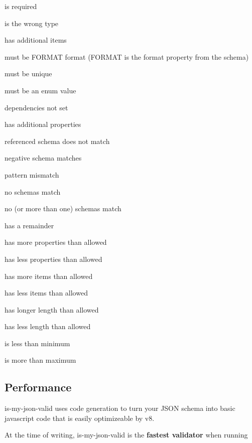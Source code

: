 \begin{DoxyItemize}
\item {\ttfamily is required}
\item {\ttfamily is the wrong type}
\item {\ttfamily has additional items}
\item {\ttfamily must be F\+O\+R\+M\+AT format} (F\+O\+R\+M\+AT is the {\ttfamily format} property from the schema)
\item {\ttfamily must be unique}
\item {\ttfamily must be an enum value}
\item {\ttfamily dependencies not set}
\item {\ttfamily has additional properties}
\item {\ttfamily referenced schema does not match}
\item {\ttfamily negative schema matches}
\item {\ttfamily pattern mismatch}
\item {\ttfamily no schemas match}
\item {\ttfamily no (or more than one) schemas match}
\item {\ttfamily has a remainder}
\item {\ttfamily has more properties than allowed}
\item {\ttfamily has less properties than allowed}
\item {\ttfamily has more items than allowed}
\item {\ttfamily has less items than allowed}
\item {\ttfamily has longer length than allowed}
\item {\ttfamily has less length than allowed}
\item {\ttfamily is less than minimum}
\item {\ttfamily is more than maximum}
\end{DoxyItemize}

\subsection*{Performance}

is-\/my-\/json-\/valid uses code generation to turn your J\+S\+ON schema into basic javascript code that is easily optimizeable by v8.

At the time of writing, is-\/my-\/json-\/valid is the {\bfseries fastest validator} when running


